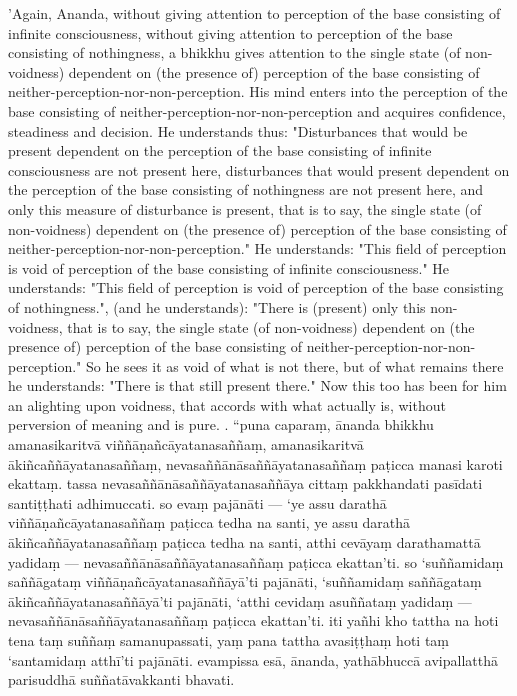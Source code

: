 \documentclass[11pt]{article}
\begin{document}
\begin{paracol}{2}
\begin{column}
'Again, Ananda, without giving attention to perception of the base consisting of infinite consciousness, without giving attention to perception of the base consisting of nothingness, a bhikkhu gives attention to the single state (of non-voidness) dependent on (the presence of) perception of the base consisting of neither-perception-nor-non-perception. His mind enters into the perception of the base consisting of neither-perception-nor-non-perception and acquires confidence, steadiness and decision. He understands thus: "Disturbances that would be present dependent on the perception of the base consisting of infinite consciousness are not present here, disturbances that would present dependent on the perception of the base consisting of nothingness are not present here, and only this measure of disturbance is present, that is to say, the single state (of non-voidness) dependent on (the presence of) perception of the base consisting of neither-perception-nor-non-perception." He understands: "This field of perception is void of perception of the base consisting of infinite consciousness." He understands: "This field of perception is void of perception of the base consisting of nothingness.", (and he understands): "There is (present) only this non-voidness, that is to say, the single state (of non-voidness) dependent on (the presence of) perception of the base consisting of neither-perception-nor-non-perception." So he sees it as void of what is not there, but of what remains there he understands: "There is that still present there." Now this too has been for him an alighting upon voidness, that accords with what actually is, without perversion of meaning and is pure.
. “puna caparaṃ, ānanda bhikkhu amanasikaritvā viññāṇañcāyatanasaññaṃ, amanasikaritvā ākiñcaññāyatanasaññaṃ, nevasaññānāsaññāyatanasaññaṃ paṭicca manasi karoti ekattaṃ. tassa nevasaññānāsaññāyatanasaññāya cittaṃ pakkhandati pasīdati santiṭṭhati adhimuccati. so evaṃ pajānāti — ‘ye assu darathā viññāṇañcāyatanasaññaṃ paṭicca tedha na santi, ye assu darathā ākiñcaññāyatanasaññaṃ paṭicca tedha na santi, atthi cevāyaṃ darathamattā yadidaṃ — nevasaññānāsaññāyatanasaññaṃ paṭicca ekattan’ti. so ‘suññamidaṃ saññāgataṃ viññāṇañcāyatanasaññāyā’ti pajānāti, ‘suññamidaṃ saññāgataṃ ākiñcaññāyatanasaññāyā’ti pajānāti, ‘atthi cevidaṃ asuññataṃ yadidaṃ — nevasaññānāsaññāyatanasaññaṃ paṭicca ekattan’ti. iti yañhi kho tattha na hoti tena taṃ suññaṃ samanupassati, yaṃ pana tattha avasiṭṭhaṃ hoti taṃ ‘santamidaṃ atthī’ti pajānāti. evampissa esā, ānanda, yathābhuccā avipallatthā parisuddhā suññatāvakkanti bhavati.

\end{column}
\end{paracol}
\end{document}
